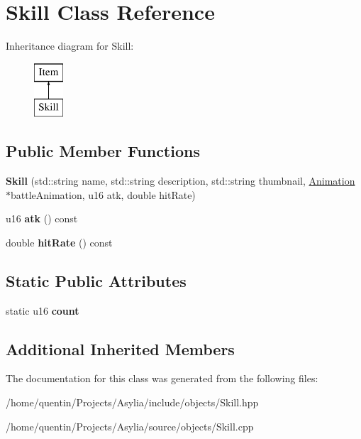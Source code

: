 \hypertarget{classSkill}{\section{Skill Class Reference}
\label{classSkill}
}
Inheritance diagram for Skill\-:\begin{figure}[H]
\begin{center}
\leavevmode
\includegraphics[height=2.000000cm]{classSkill}
\end{center}
\end{figure}
\subsection*{Public Member Functions}
\begin{DoxyCompactItemize}
\item 
\hypertarget{classSkill_a2f4f9de2c5ec6f91f341a60dec4a120b}{{\bfseries Skill} (std\-::string name, std\-::string description, std\-::string thumbnail, \hyperlink{classAnimation}{Animation} $\ast$battle\-Animation, u16 atk, double hit\-Rate)}\label{classSkill_a2f4f9de2c5ec6f91f341a60dec4a120b}

\item 
\hypertarget{classSkill_a05816e34c4fa783e5072a21f18f85a5d}{u16 {\bfseries atk} () const }\label{classSkill_a05816e34c4fa783e5072a21f18f85a5d}

\item 
\hypertarget{classSkill_a34da49de20b937fc79bff950ff4298aa}{double {\bfseries hit\-Rate} () const }\label{classSkill_a34da49de20b937fc79bff950ff4298aa}

\end{DoxyCompactItemize}
\subsection*{Static Public Attributes}
\begin{DoxyCompactItemize}
\item 
\hypertarget{classSkill_a307b7b6a4a71a9aa8a826915dd208dd2}{static u16 {\bfseries count}}\label{classSkill_a307b7b6a4a71a9aa8a826915dd208dd2}

\end{DoxyCompactItemize}
\subsection*{Additional Inherited Members}


The documentation for this class was generated from the following files\-:\begin{DoxyCompactItemize}
\item 
/home/quentin/\-Projects/\-Asylia/include/objects/Skill.\-hpp\item 
/home/quentin/\-Projects/\-Asylia/source/objects/Skill.\-cpp\end{DoxyCompactItemize}
